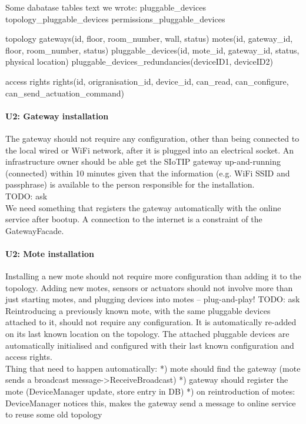     Some dabatase tables text we wrote:
        pluggable_devices
        topology_pluggable_devices
        permissions_pluggable_devices

        topology
            gateways(id, floor, room_number, wall, status)
            motes(id, gateway_id, floor, room_number, status)
            pluggable_devices(id, mote_id, gateway_id, status, physical location)
            pluggable_devices_redundancies(deviceID1, deviceID2)

        access rights
            rights(id, origranisation_id, device_id, can_read, can_configure, can_send_actuation_command)

    \paragraph{U2: Gateway installation}
        The gateway should not require any configuration, other than being connected
        to the local wired or WiFi network, after it is plugged into an electrical
        socket. An infrastructure owner should be able get the SIoTIP gateway
        up-and-running (connected) within 10 minutes given that the information
        (e.g. WiFi SSID and passphrase) is available to the person responsible for
        the installation. \\
        TODO: ask \\
        We need something that registers the gateway automatically with the
        online service after bootup. A connection to the internet is a constraint
        of the GatewayFacade.


    \paragraph{U2: Mote installation}
        Installing a new mote should not require more configuration than adding it
        to the topology. Adding new motes, sensors or actuators should not involve
        more than just starting motes, and plugging devices into motes – plug-and-play! TODO: ask \\
        Reintroducing a previously known mote, with the same pluggable devices attached to it,
        should not require any configuration. It is automatically re-added on
        its last known location on the topology. The attached pluggable devices
        are automatically initialised and configured with their last known
        configuration and access rights. \\
        Thing that need to happen automatically:
        *) mote should find the gateway (mote sends a broadcast message->ReceiveBroadcast)
        *) gateway should register the mote (DeviceManager update, store entry in DB)
        *) on reintroduction of motes: DeviceManager notices this, makes the gateway send a message to online service to reuse some old topology

